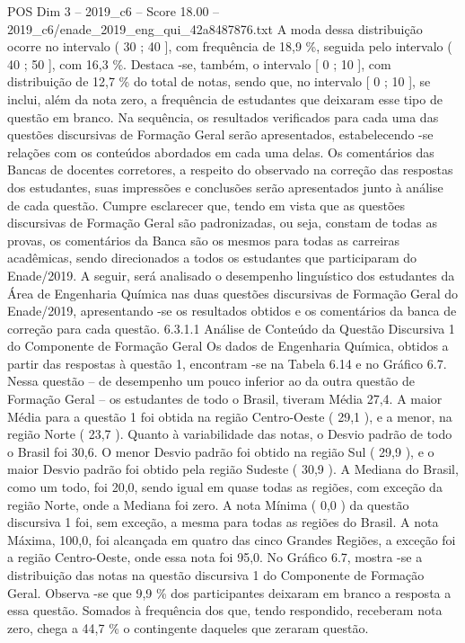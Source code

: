 \begin{textsample}{POS Dim 3 – 2019\_c6 – Score 18.00 – 2019\_c6/enade\_2019\_eng\_qui\_42a8487876.txt}
A moda dessa distribuição ocorre no intervalo ( 30 ; 40 ], com frequência de 18,9 \%, seguida pelo intervalo ( 40 ; 50 ], com 16,3 \%.
Destaca -se, também, o intervalo [ 0 ; 10 ], com distribuição de 12,7 \% do total de notas, sendo que, no intervalo [ 0 ; 10 ], se inclui, além da nota zero, a frequência de estudantes que deixaram esse tipo de questão em branco.
Na sequência, os resultados verificados para cada uma das questões discursivas de Formação Geral serão apresentados, estabelecendo -se relações com os conteúdos abordados em cada uma delas.
Os comentários das Bancas de docentes corretores, a respeito do observado na correção das respostas dos estudantes, suas impressões e conclusões serão apresentados junto à análise de cada questão.
Cumpre esclarecer que, tendo em vista que as questões discursivas de Formação Geral são padronizadas, ou seja, constam de todas as provas, os comentários da Banca são os mesmos para todas as carreiras acadêmicas, sendo direcionados a todos os estudantes que participaram do Enade/2019.
A seguir, será analisado o desempenho linguístico dos estudantes da Área de Engenharia Química nas duas questões discursivas de Formação Geral do Enade/2019, apresentando -se os resultados obtidos e os comentários da banca de correção para cada questão. 6.3.1.1 Análise de Conteúdo da Questão Discursiva 1 do Componente de Formação Geral Os dados de Engenharia Química, obtidos a partir das respostas à questão 1, encontram -se na Tabela 6.14 e no Gráfico 6.7.
Nessa questão – de desempenho um pouco inferior ao da outra questão de Formação Geral – os estudantes de todo o Brasil, tiveram Média 27,4.
A maior Média para a questão 1 foi obtida na região Centro-Oeste ( 29,1 ), e a menor, na região Norte ( 23,7 ).
Quanto à variabilidade das notas, o Desvio padrão de todo o Brasil foi 30,6.
O menor Desvio padrão foi obtido na região Sul ( 29,9 ), e o maior Desvio padrão foi obtido pela região Sudeste ( 30,9 ).
A Mediana do Brasil, como um todo, foi 20,0, sendo igual em quase todas as regiões, com exceção da região Norte, onde a Mediana foi zero.
A nota Mínima ( 0,0 ) da questão discursiva 1 foi, sem exceção, a mesma para todas as regiões do Brasil.
A nota Máxima, 100,0, foi alcançada em quatro das cinco Grandes Regiões, a exceção foi a região Centro-Oeste, onde essa nota foi 95,0.
No Gráfico 6.7, mostra -se a distribuição das notas na questão discursiva 1 do Componente de Formação Geral.
Observa -se que 9,9 \% dos participantes deixaram em branco a resposta a essa questão.
Somados à frequência dos que, tendo respondido, receberam nota zero, chega a 44,7 \% o contingente daqueles que zeraram questão.

\end{textsample}
